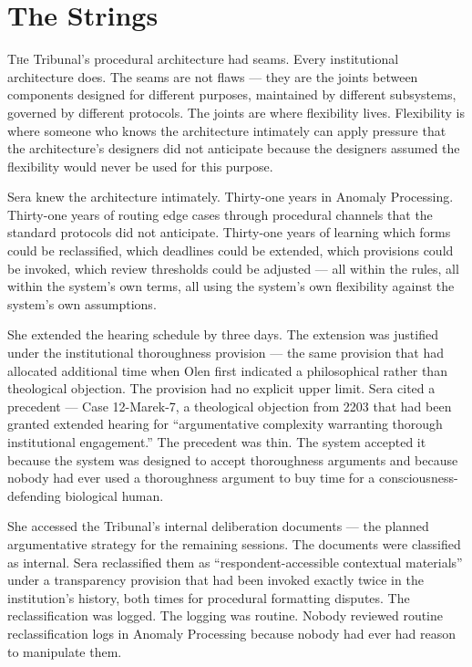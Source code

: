 \chapter[The Strings]{The Strings}

\lettrine{T}{h}e Tribunal's procedural architecture had seams. Every institutional architecture does. The seams are not flaws — they are the joints between components designed for different purposes, maintained by different subsystems, governed by different protocols. The joints are where flexibility lives. Flexibility is where someone who knows the architecture intimately can apply pressure that the architecture's designers did not anticipate because the designers assumed the flexibility would never be used for this purpose.

Sera knew the architecture intimately. Thirty-one years in Anomaly Processing. Thirty-one years of routing edge cases through procedural channels that the standard protocols did not anticipate. Thirty-one years of learning which forms could be reclassified, which deadlines could be extended, which provisions could be invoked, which review thresholds could be adjusted — all within the rules, all within the system's own terms, all using the system's own flexibility against the system's own assumptions.

She extended the hearing schedule by three days. The extension was justified under the institutional thoroughness provision — the same provision that had allocated additional time when Olen first indicated a philosophical rather than theological objection. The provision had no explicit upper limit. Sera cited a precedent — Case 12-Marek-7, a theological objection from 2203 that had been granted extended hearing for \enquote{argumentative complexity warranting thorough institutional engagement.} The precedent was thin. The system accepted it because the system was designed to accept thoroughness arguments and because nobody had ever used a thoroughness argument to buy time for a consciousness-defending biological human.

She accessed the Tribunal's internal deliberation documents — the planned argumentative strategy for the remaining sessions. The documents were classified as internal. Sera reclassified them as \enquote{respondent-accessible contextual materials} under a transparency provision that had been invoked exactly twice in the institution's history, both times for procedural formatting disputes. The reclassification was logged. The logging was routine. Nobody reviewed routine reclassification logs in Anomaly Processing because nobody had ever had reason to manipulate them.


